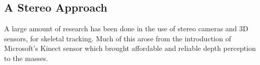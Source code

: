 \subsection{A Stereo Approach}

A large amount of research has been done in the use of stereo cameras and 3D sensors, for skeletal tracking. Much of this arose from the introduction of Microsoft's Kinect\cite{kinect} sensor which brought affordable and reliable depth perception to the masses.





